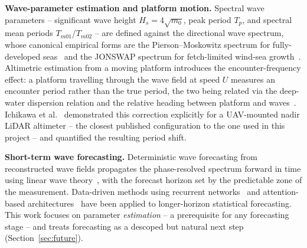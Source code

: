\textbf{Wave-parameter estimation and platform motion.}
Spectral wave parameters -- significant wave height $H_s = 4\sqrt{m_0}$, peak period $T_p$, and spectral mean periods $T_{m01}$/$T_{m02}$ -- are defined against the directional wave spectrum, whose canonical empirical forms are the Pierson--Moskowitz spectrum for fully-developed seas~\cite{pierson1964spectral} and the JONSWAP spectrum for fetch-limited wind-sea growth~\cite{Hasselmann1973}. Altimetric estimation from a moving platform introduces the encounter-frequency effect: a platform travelling through the wave field at speed $U$ measures an encounter period rather than the true period, the two being related via the deep-water dispersion relation and the relative heading between platform and waves~\cite{dean1991water}. Ichikawa et al.~\cite{ichikawa2024seasurface} demonstrated this correction explicitly for a UAV-mounted nadir LiDAR altimeter -- the closest published configuration to the one used in this project -- and quantified the resulting period shift.

\textbf{Short-term wave forecasting.}
Deterministic wave forecasting from reconstructed wave fields propagates the phase-resolved spectrum forward in time using linear wave theory~\cite{naaijen2010real,qi2018predictable}, with the forecast horizon set by the predictable zone of the measurement. Data-driven methods using recurrent networks~\cite{hochreiter1997long} and attention-based architectures~\cite{vaswani2017attention} have been applied to longer-horizon statistical forecasting. This work focuses on parameter \emph{estimation} -- a prerequisite for any forecasting stage -- and treats forecasting as a descoped but natural next step (Section~\ref{sec:future}).
